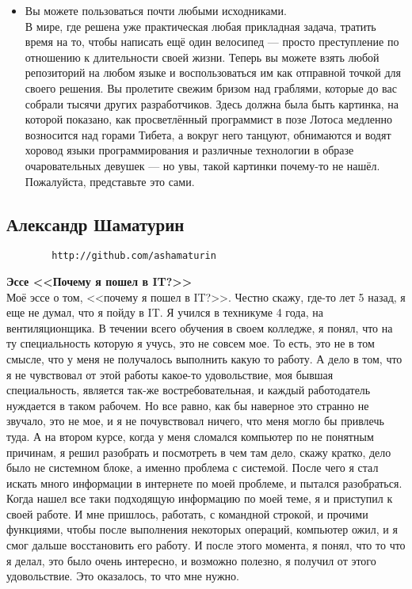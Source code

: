 \documentclass[14pt,a4paper,oneside]{extbook}
\begin{document}
\begin{itemize}
			\item Вы можете пользоваться почти любыми исходниками.\\ В мире, где решена уже практическая любая прикладная задача, тратить время на то, чтобы написать ещё один велосипед --- просто преступление по отношению к длительности своей жизни. Теперь вы можете взять любой репозиторий на любом языке и воспользоваться им как отправной точкой для своего решения. Вы пролетите свежим бризом над граблями, которые до вас собрали тысячи других разработчиков. Здесь должна была быть картинка, на которой показано, как просветлённый программист в позе Лотоса медленно возносится над горами Тибета, а вокруг него танцуют, обнимаются и водят хоровод языки программирования и различные технологии в образе очаровательных девушек --- но увы, такой картинки почему-то не нашёл. Пожалуйста, представьте это сами.
		\end{itemize}
		
		\subsection{Александр Шаматурин}
		\begin{verbatim}
		http://github.com/ashamaturin
		\end{verbatim}
		
		\noindent\textbf{Эссе <<Почему я пошел в IT?>>}\\
		
		Моё эссе о том, <<почему я пошел в IT?>>. Честно скажу, где-то лет 5 назад, я еще не думал, что я пойду в IT. Я учился в техникуме 4 года, на вентиляционщика. В течении всего обучения в своем колледже, я понял, что на ту специальность которую я учусь, это не совсем мое. То есть, это не в том смысле, что у меня не получалось выполнить какую то работу. А дело в том, что я не чувствовал от этой работы какое-то удовольствие, моя бывшая специальность, является так-же востребовательная, и каждый работодатель нуждается в таком рабочем. Но все равно, как бы наверное это странно не звучало, это не мое, и я не почувствовал ничего, что меня могло бы привлечь туда. А на втором курсе, когда у меня сломался компьютер по не понятным причинам, я решил разобрать и посмотреть в чем там дело, скажу кратко, дело было не системном блоке, а именно проблема с системой. После чего я стал искать много информации в интернете по моей проблеме, и пытался разобраться. Когда нашел все таки подходящую информацию по моей теме, я и приступил к своей работе. И мне пришлось, работать, с командной строкой, и прочими функциями, чтобы после выполнения некоторых операций, компьютер ожил, и я смог дальше восстановить его работу. И после этого момента, я понял, что то что я делал, это было очень интересно, и возможно полезно, я получил от этого удовольствие. Это оказалось, то что мне нужно.
		
\end{document}
